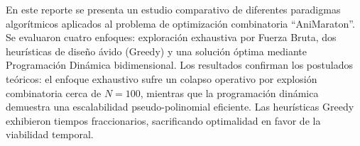 En este reporte se presenta un estudio comparativo de diferentes paradigmas algorítmicos aplicados al problema de optimización combinatoria ``AniMaraton''. Se evaluaron cuatro enfoques: exploración exhaustiva por Fuerza Bruta, dos heurísticas de diseño ávido (Greedy) y una solución óptima mediante Programación Dinámica bidimensional. Los resultados confirman los postulados teóricos: el enfoque exhaustivo sufre un colapso operativo por explosión combinatoria cerca de $N=100$, mientras que la programación dinámica demuestra una escalabilidad pseudo-polinomial eficiente. Las heurísticas Greedy exhibieron tiempos fraccionarios, sacrificando optimalidad en favor de la viabilidad temporal.